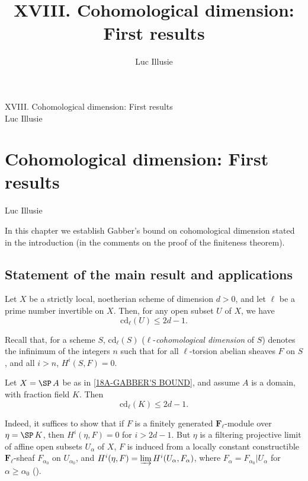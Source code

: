 \documentclass[10pt]{../fichiers-configuration-latex/smfart}
\author{Luc Illusie}
\title{XVIII. Cohomological dimension: First results}
\begin{document}
\begin{center}
XVIII. Cohomological dimension: First results\\
Luc Illusie
\end{center}

\tableofcontents

\else
{}
\chapter{Cohomological dimension: First results}
\begin{center}
Luc Illusie
\end{center}
\fi


In this chapter we establish Gabber's bound on cohomological dimension stated in the introduction
(in the comments on the proof of the finiteness theorem).

\section{Statement of the main result and applications}

\begin{theorem}[Gabber]\label{18A-GABBER'S BOUND}
Let $X$ be a strictly local, noetherian scheme of dimension $d >0$, and let $\ell$ be a prime
number invertible on $X$. Then, for any open subset $U$ of $X$, we have
\begin{equation}\label{18A-Gabber's bound1} \mathrm{cd}_{\ell}(U) \le 2d-1.  \end{equation}
\end{theorem}
Recall that, for a scheme $S$, $\mathrm{cd}_{\ell}(S)$ ($\ell$-\textit{cohomological
dimension} of $S$) denotes the infinimum of the integers $n$ such that for all $\ell$-torsion abelian
sheaves $F$ on $S$, and all $i > n$, $H^i(S,F) = 0$.  \begin{corollary}\label{18A-fraction field}
Let $X = \SP \,A$ be as in \ref{18A-GABBER'S BOUND}, and assume $A$ is a domain, with fraction field
$K$. Then \begin{equation}\label{18A-fraction field1} \mathrm{cd}_{\ell}(K) \le 2d-1.
\end{equation} \end{corollary} Indeed, it suffices to show that if $F$ is a finitely generated
$\mathbf{F}_{\ell}$-module over $\eta = \SP\, K$, then $H^i(\eta,F) = 0$ for $i > 2d-1$. But $\eta$
is a filtering projective limit of affine open subsets $U_{\alpha}$ of $X$, $F$ is induced from a
locally constant constructible $\mathbf{F}_{\ell}$-sheaf $F_{\alpha_0}$ on $U_{\alpha_0}$, and
$H^i(\eta,F) = \varinjlim H^i(U_{\alpha},F_{\alpha})$, where $F_{\alpha} = F_{\alpha_0} |
U_{\alpha}$ for $\alpha \ge \alpha_0$ ().
\end{document}
